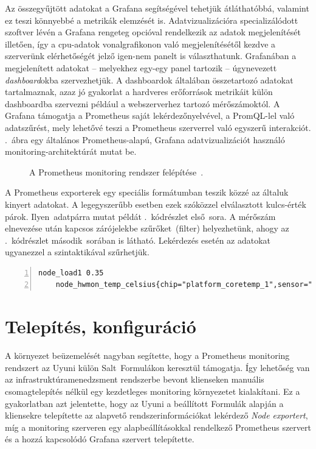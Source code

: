 Az összegyűjtött adatokat a Grafana segítségével tehetjük átláthatóbbá, valamint ez teszi könnyebbé a metrikák elemzését is. Adatvizualizációra specializálódott szoftver lévén a Grafana rengeteg opcióval rendelkezik az adatok megjelenítését illetően, így a \acrshort{cpu}-adatok vonalgrafikonon való megjelenítésétől kezdve a szerverünk elérhetőségét jelző igen-nem panelt is választhatunk.
Grafanában a megjelenített adatokat -- melyekhez egy-egy panel tartozik -- úgynevezett \textit{dashboard}okba szervezhetjük. A dashboardok általában összetartozó adatokat tartalmaznak, azaz jó gyakorlat a hardveres erőforrások metrikáit külön dashboardba szervezni például a webszerverhez tartozó mérőszámoktól. %
A Grafana támogatja a Prometheus saját lekérdezőnyelvével, a PromQL-lel való adatszűrést, mely lehetővé teszi a Prometheus szerverrel való egyszerű interakciót.
.~ábra egy általános Prometheus-alapú, Grafana adatvizualizációt használó monitoring-architektúrát mutat be.

\vspace{0.25cm}
\begin{figure}[ht]
	\centering
	
	\caption{A Prometheus monitoring rendszer felépítése~\cite{PrometheusIntro}.}
	\label{fig:prometheus-architecture}
\end{figure}

A Prometheus exporterek egy speciális formátumban teszik közzé az általuk kinyert adatokat. A legegyszerűbb esetben ezek szóközzel elválasztott kulcs-érték párok. Ilyen~adatpárra mutat példát .~kódrészlet első~sora. A mérőszám elnevezése után kapcsos zárójelekbe szűrőket~(filter) helyezhetünk, ahogy az .~kódrészlet második~sorában is látható. Lekérdezés esetén az adatokat ugyanezzel a szintaktikával szűrhetjük.

\vspace{2mm}
\begin{lstlisting}[caption=Prometheus exporterek által közzétett adatok.,label=lst:prometheus-data-format, numbers=left]
	node_load1 0.35
	node_hwmon_temp_celsius{chip="platform_coretemp_1",sensor="temp2"} 28
\end{lstlisting}

\section{Telepítés, konfiguráció}
\label{sect:monitoring-installation}
A környezet beüzemelését nagyban segítette, hogy a Prometheus monitoring rendszert az Uyuni külön Salt~Formulákon keresztül támogatja. Így lehetőség van az infrastruktúramenedzsment rendszerbe bevont klienseken manuális csomagtelepítés nélkül egy kezdetleges monitoring környezetet kialakítani. Ez a gyakorlatban azt jelentette, hogy az Uyuni a beállított Formulák alapján a kliensekre telepítette az alapvető rendszerinformációkat lekérdező \textit{Node exportert}, míg a monitoring szerveren egy alapbeállításokkal rendelkező Prometheus szervert és a hozzá kapcsolódó Grafana szervert telepítette.


